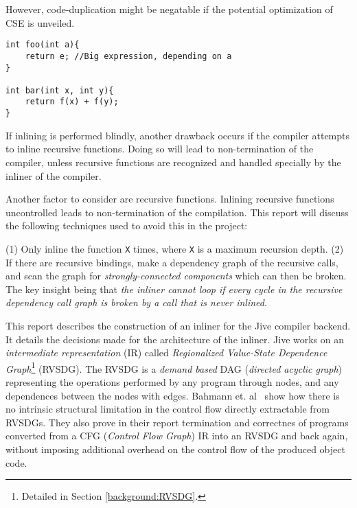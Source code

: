 However, code-duplication might be negatable if the potential optimization of
CSE is unveiled.

\begin{lstlisting}[label={lst:code-dup}, style=global_customcpp,
caption={Code duplication in \lstinline!bar()!, when inlining \lstinline!foo()!
into \lstinline!bar()!.}]
int foo(int a){
	return e; //Big expression, depending on a
}

int bar(int x, int y){
	return f(x) + f(y);
}
\end{lstlisting}
\vspace{-4\parskip} %

If inlining is performed blindly, another drawback occurs if the compiler
attempts to inline recursive functions. Doing so will lead to non-termination of
the compiler, unless recursive functions are recognized and handled specially by
the inliner of the compiler.

Another factor to consider are recursive functions. Inlining recursive functions
uncontrolled leads to non-termination of the compilation. This report will
discuss the following techniques used to avoid this in the project:

(1) Only inline the function \lstinline!X! times, where \lstinline!X! is a
maximum recursion depth\cite{GHCPaper}\cite{InlineWhenHowSerrano}. (2) If there
are recursive bindings, make a dependency graph of the recursive calls, and scan
the graph for \textit {strongly-connected components} which can then be broken.
The key insight being that \textit{the inliner cannot loop if every cycle in the
recursive dependency call graph is broken by a call that is never
inlined}\cite{BasMscThesis}\cite{GHCPaper}.

This report describes the construction of an inliner for the Jive compiler
backend. It details the decisions made for the architecture of the inliner. Jive
works on an \textit{intermediate representation} (IR) called
\textit{Regionalized Value-State Dependence Graph}\footnote{Detailed in Section
\ref{background:RVSDG}.} (RVSDG). The RVSDG is a \textit{demand based} DAG
(\textit{directed acyclic graph}) representing the operations performed by any
program through nodes, and any dependences between the nodes with
edges. Bahmann et. al~\cite{RVSDG:HiPEACpaper} show how there is no intrinsic
structural limitation in the control flow directly extractable from RVSDGs. They
also prove in their report termination and correctnes of programs converted from
a CFG (\textit{Control Flow Graph}) IR into an RVSDG and back again, without
imposing additional overhead on the control flow of the produced object code.

